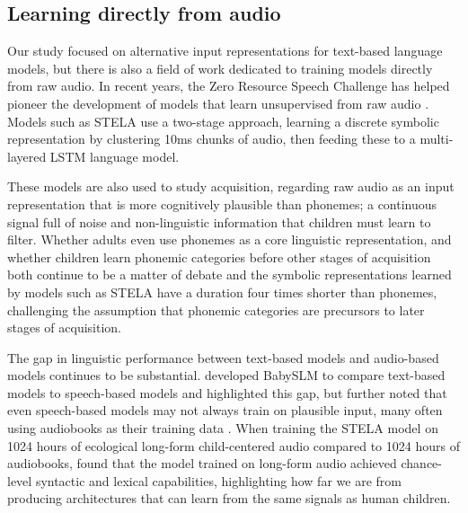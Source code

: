 \subsection{Learning directly from audio}
\label{sec:14-audiomodels}

Our study focused on alternative input representations for text-based language models, but there is also a field of work dedicated to training models directly from raw audio.
In recent years, the Zero Resource Speech Challenge has helped pioneer the development of models that learn unsupervised from raw audio \citep{dunbar_self-supervised_2022}. Models such as STELA \citep{schatz2021early, lavechin2022can} use a two-stage approach, learning a discrete symbolic representation by clustering 10ms chunks of audio, then feeding these to a multi-layered LSTM language model.

These models are also used to study acquisition, regarding raw audio as an input representation that is more cognitively plausible than phonemes; a continuous signal full of noise and non-linguistic information that children must learn to filter. Whether adults even use phonemes as a core linguistic representation, and whether children learn phonemic categories before other stages of acquisition both continue to be a matter of debate \citep{kazanina2018phonemes, matusevych2023infant} and the symbolic representations learned by models such as STELA have a duration four times shorter than phonemes, challenging the assumption that phonemic categories are precursors to later stages of acquisition. 

The gap in linguistic performance between text-based models and audio-based models continues to be substantial. \citet{lavechin} developed BabySLM to compare text-based models to speech-based models and highlighted this gap, but further noted that even speech-based models may not always train on plausible input, many often using audiobooks as their training data \citep{Kahn_2020}. When training the STELA model on 1024 hours of ecological long-form child-centered audio compared to 1024 hours of audiobooks, \citet{lavechin} found that the model trained on long-form audio achieved chance-level syntactic and lexical capabilities, highlighting how far we are from producing architectures that can learn from the same signals as human children.


